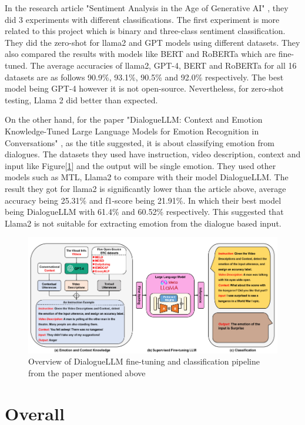 In the research article "Sentiment Analysis in the Age of Generative AI" \cite{Krugmann_Hartmann_2024}, they did 3 experiments with different classifications. The first experiment is more related to this project which is binary and three-class sentiment classification. They did the zero-shot for llama2 and GPT models using different datasets. They also compared the results with models like BERT and RoBERTa which are fine-tuned. The average accuracies of llama2, GPT-4, BERT and RoBERTa for all 16 datasets are as follows 90.9\%, 93.1\%, 90.5\% and 92.0\% respectively. The best model being GPT-4 however it is not open-source. Nevertheless, for zero-shot testing, Llama 2 did better than expected.

On the other hand, for the paper "DialogueLLM: Context and Emotion Knowledge-Tuned Large Language Models for Emotion Recognition in Conversations" \cite{zhang2024dialoguellm}, as the title suggested, it is about classifying emotion from dialogues. The datasets they used have instruction, video description, context and input like Figure[\ref{fig:DialogueLLM}] and the output will be single emotion. They used other models such as MTL, Llama2 to compare with their model DialogueLLM. The result they got for llama2 is significantly lower than the article above, average accuracy being 25.31\% and f1-score being 21.91\%. In which their best model being DialogueLLM with 61.4\% and 60.52\% respectively. This suggested that Llama2 is not suitable for extracting emotion from the dialogue based input. 
\begin{figure}[!htb]
    \centerline{\includegraphics[scale=.68]{Figures/dialogueLLM.png}}
    \caption{Overview of DialogueLLM fine-tuning and classification pipeline from the paper mentioned above}
    \label{fig:DialogueLLM}
 \end{figure}
 
 \section{Overall}


